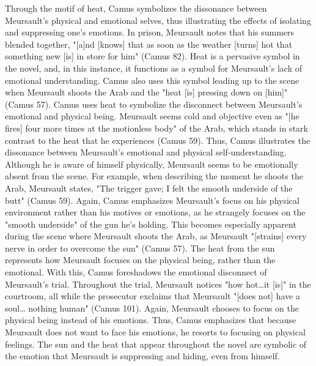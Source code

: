 \documentclass[12pt]{article}
\begin{document}
    Through the motif of heat, Camus symbolizes the dissonance between
    Meursault's physical and emotional selves, thus illustrating the effects
    of isolating and suppressing one's emotions. In prison, Meursault notes
    that his summers blended together, "[a]nd [knows] that as soon as the
    weather [turns] hot that something new [is] in store for him" (Camus
    82). Heat is a pervasive symbol in the novel, and, in this instance, it
    functions as a symbol for Meursault's lack of emotional understanding.
    Camus also uses this symbol leading up to the scene when Meursault
    shoots the Arab and the "heat [is] pressing down on [him]" (Camus 57).
    Camus uses heat to symbolize the disconnect between Meursault's
    emotional and physical being. Meursault seems cold and objective even as
    "[he fires] four more times at the motionless body" of the Arab, which
    stands in stark contrast to the heat that he experiences (Camus 59).
    Thus, Camus illustrates the dissonance between Meursault's emotional and
    physical self-understanding. Although he is aware of himself physically,
    Meursault seems to be emotionally absent from the scene. For example,
    when describing the moment he shoots the Arab, Meursault states, "The
    trigger gave; I felt the smooth underside of the butt" (Camus 59).
    Again, Camus emphasizes Meursault's focus on his physical environment
    rather than his motives or emotions, as he strangely focuses on the
    "smooth underside" of the gun he's holding. This becomes especially
    apparent during the scene where Meursault shoots the Arab, as Meursault
    "[strains] every nerve in order to overcome the sun" (Camus 57). The
    heat from the sun represents how Meursault focuses on the physical
    being, rather than the emotional. With this, Camus foreshadows the
    emotional disconnect of Meursault's trial. Throughout the trial,
    Meursault notices "how hot…it [is]" in the courtroom, all while the
    prosecutor exclaims that Meursault "[does not] have a soul… nothing
    human" (Camus 101). Again, Meursault chooses to focus on the physical
    being instead of his emotions. Thus, Camus emphasizes that because
    Meursault does not want to face his emotions, he resorts to focusing on
    physical feelings. The sun and the heat that appear throughout the novel
    are symbolic of the emotion that Meursault is suppressing and hiding,
    even from himself. \\
\end{document}
